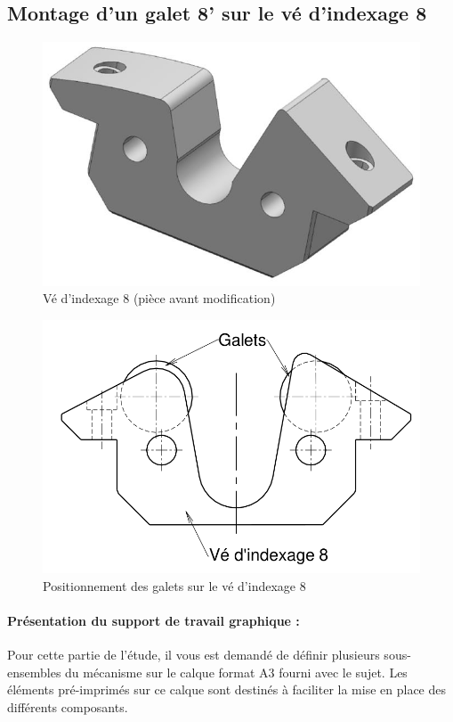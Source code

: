 \subsection{Montage d’un galet 8’ sur le vé d’indexage 8}

\begin{figure}[!h]
\centering\includegraphics[width=0.6\linewidth]{img/fig11}
 \caption{Vé d’indexage 8 (pièce avant modification)}
 \label{img11}
\end{figure}

\begin{figure}[!h]
\centering\includegraphics[width=0.6\linewidth]{img/fig12}
 \caption{Positionnement des galets sur le vé d’indexage 8}
 \label{img12}
\end{figure}


\paragraph{Présentation du support de travail graphique :}

Pour cette partie de l’étude, il vous est demandé de définir plusieurs sous-ensembles du mécanisme sur le calque format A3 fourni avec le sujet. Les éléments pré-imprimés sur ce calque sont destinés à faciliter la mise en place des différents composants.

